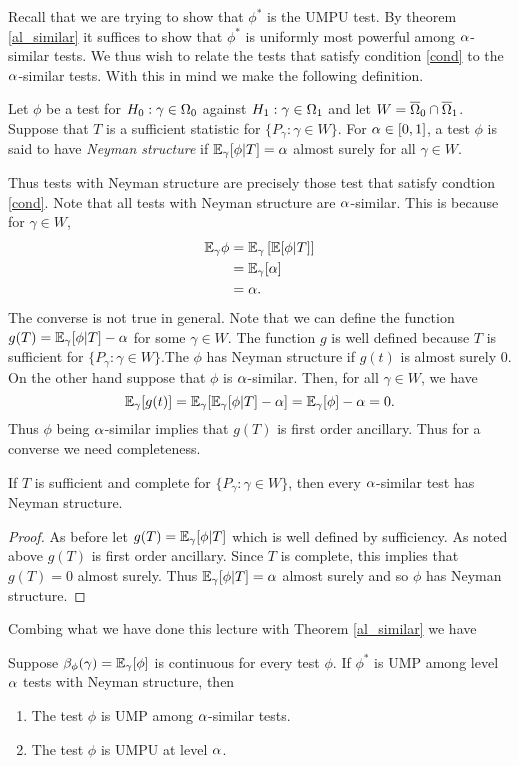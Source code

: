 Recall that we are trying to show that $\phi^*$ is the UMPU test. By theorem \eqref{al_similar} it suffices to show that $\phi^*$ is uniformly most powerful among ${\alpha}$-similar tests. We thus wish to relate the tests that satisfy condition \eqref{cond} to the ${\alpha}$-similar tests. With this in mind we make the following definition.
\begin{defn}
    Let $\phi$ be a test for $H_0 : \gamma \in{{\Omega}}_0$ against $H_1 : \gamma \in {{\Omega}}_1$ and let $W = \overline{{{\Omega}}}_0 \cap \overline{{{\Omega}}}_1$. Suppose that $T$ is a sufficient statistic for $\{P_\gamma : \gamma \in W\}$. For ${\alpha} \in [0,1]$, a test $\phi$ is said to have \emph{Neyman structure} if ${\mathbb{E}}_\gamma[\phi|T]={\alpha}$ almost surely for all $\gamma \in W$.     
\end{defn}
Thus tests with Neyman structure are precisely those test that satisfy condtion \eqref{cond}. Note that all tests with Neyman structure are ${\alpha}$-similar. This is because for $\gamma \in W$,
\begin{align*}
    {\mathbb{E}}_{\gamma} \phi &= {\mathbb{E}}_\gamma \left[{\mathbb{E}}[\phi|T]\right]\\
    &={\mathbb{E}}_\gamma [{\alpha}]\\
    &={\alpha}.
\end{align*}
The converse is not true in general. Note that we can define the function $g(T) = {\mathbb{E}}_\gamma[\phi|T]-{\alpha}$ for some $\gamma \in W$. The function $g$ is well defined because $T$ is sufficient for $\{P_\gamma : \gamma \in W\}$.The $\phi$ has Neyman structure if $g(t)$ is almost surely 0. On the other hand suppose that $\phi$ is ${\alpha}$-similar. Then, for all $\gamma \in W$, we have
\[{\mathbb{E}}_\gamma[g(t)] = {\mathbb{E}}_\gamma[{\mathbb{E}}_\gamma[\phi|T]-{\alpha}] = {\mathbb{E}}_\gamma[\phi]-{\alpha} = 0. \]
Thus $\phi$ being ${\alpha}$-similar implies that $g(T)$ is first order ancillary. Thus for a converse we need completeness.
\begin{lemma}
    If $T$ is sufficient and complete for $\{P_\gamma : \gamma \in W\}$, then every ${\alpha}$-similar test has Neyman structure.
\end{lemma}
\begin{proof}
    As before let $g(T) = {\mathbb{E}}_\gamma[\phi|T]$ which is well defined by sufficiency. As noted above $g(T)$ is first order ancillary. Since $T$ is complete, this implies that $g(T)=0$ almost surely. Thus ${\mathbb{E}}_\gamma[\phi|T]={\alpha}$ almost surely and so $\phi$ has Neyman structure.
\end{proof}
Combing what we have done this lecture with Theorem \eqref{al_similar} we have
\begin{thrm}
    Suppose $\beta_\phi(\gamma)= {\mathbb{E}}_\gamma[\phi]$ is continuous for every test $\phi$. If $\phi^*$ is UMP among level ${\alpha}$ tests with Neyman structure, then
    \begin{enumerate}
        \item The test $\phi$ is UMP among ${\alpha}$-similar tests.
        \item The test $\phi$ is UMPU at level ${\alpha}$.
    \end{enumerate}
\end{thrm}
